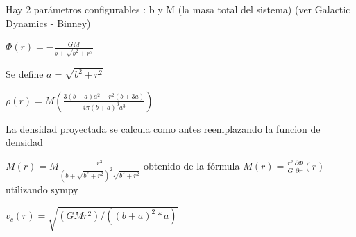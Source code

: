 \documentclass[12pt]{book}
\begin{document}
\begin{description}
\item Hay 2 parámetros configurables : b  y M (la masa total del sistema) (ver Galactic Dynamics - Binney) 
\item $ \Phi(r) =  -\frac{G  M}  {b + \sqrt{b^2 + r^2}}  $
\item  Se define  $a = \sqrt{b^2 + r^2}$
\item $ \rho(r) =  M  ( \frac{3(b+a)a^2 - r^2(b+3a) }{4 \pi (b+a)^3  a^3 })$		
\item La densidad proyectada se calcula como antes reemplazando la funcion de densidad
\item $ M(r) = M\frac{r^3}{(b + \sqrt{b^2 + r^2})^2 \sqrt{b^2 + r^2}} $ 
obtenido  de la fórmula 
$M(r) = \frac{r^2}{G}\frac{\partial \Phi}{\partial r}(r)$
utilizando sympy

\item $ v_c(r) =  \sqrt{(G  M  r ^ 2)/((b + a)^2 * a)} $ 
\end{description}
\end{document}
